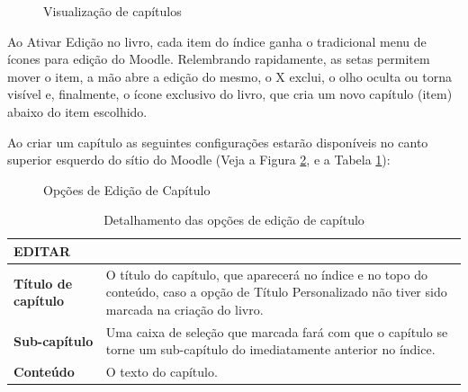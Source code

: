 \begin{figure}[htbp]
         \begin{center}
          \caption{Visualização de capítulos}
          \label{fig:cap4_33}
         \end{center}
\end{figure}

Ao Ativar Edição no livro, cada item do índice ganha o tradicional menu de ícones para edição do Moodle. Relembrando rapidamente, as setas permitem mover o item, a mão abre a edição do mesmo, o X exclui, o olho oculta ou torna visível e, finalmente, o ícone exclusivo do livro, que cria um novo capítulo (item) abaixo do item escolhido.

Ao criar um capítulo as seguintes configurações estarão disponíveis no canto superior esquerdo do sítio do Moodle (Veja a Figura \ref{fig:cap4_34}, e a Tabela \ref{tab:ConfCaptulo}):
\begin{figure}[htbp]
         \begin{center}
          \caption{Opções de Edição de Capítulo}
          \label{fig:cap4_34}
         \end{center}
\end{figure}
\begin{table}[htbp]
\begin{flushleft}
    \begin{tabular}{p{6cm}|p{9cm}} \hline
\rowcolor[rgb]{0.8,0.8,0.8} \textbf{EDITAR}&\\\hline
\textbf{Título de capítulo} & O título do capítulo, que aparecerá no índice e no topo do conteúdo, caso a opção de Título Personalizado não tiver sido marcada na criação do livro. \\\hline
\textbf{Sub-capítulo} & Uma caixa de seleção que marcada fará com que o capítulo se torne um sub-capítulo do imediatamente anterior no índice.\\\hline
\textbf{Conteúdo} & O texto do capítulo.\\\hline

\end{tabular}
    \caption{Detalhamento das opções de edição de capítulo}
  \label{tab:ConfCaptulo}
  \end{flushleft}
\end{table}%
